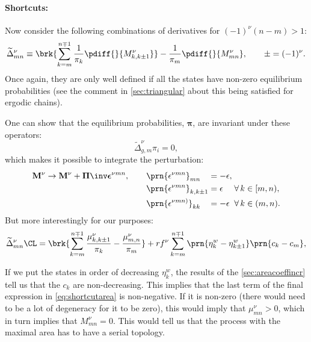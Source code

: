 \documentclass[12pt]{article}
\newcommand{\eqm}{\pi}
\newcommand{\eq}{\boldsymbol{\eqm}}
\newcommand{\Eqm}{\Pi}
\newcommand{\Eq}{\boldsymbol{\Eqm}}
\newcommand{\etwm}{\eta^w}
\newcommand{\MMdm}{M}
\newcommand{\MMd}{\mathbf{\MMdm}}
\newcommand{\kktm}{\mu}
\begin{document}
\paragraph{Shortcuts:}\label{sec:shortcuts}

Now consider the following combinations of derivatives for $(-1)^\nu (n - m) > 1$:
%
\begin{equation}\label{eq:shortcutderiv}
  \widetilde{\Delta}^\nu_{mn} \equiv
    \brk{ \sum_{k=m}^{n \mp 1} \frac{1}{\eqm_{k}} \pdiff{}{\MMdm^\nu_{k,k \pm 1}} }
    - \frac{1}{\eqm_m} \pdiff{}{\MMdm^\nu_{mn}},
  \qquad \pm = (-1)^\nu.
\end{equation}
%
Once again, they are only well defined if all the states have non-zero equilibrium probabilities (see the comment in \cref{sec:triangular} about this being satisfied for ergodic chains).

One can show that the equilibrium probabilities, $\eq$, are invariant under these operators:
%
\begin{equation}\label{eq:shortcutprob}
  \widetilde{\Delta}^\nu_{g,m} \eqm_i = 0,
\end{equation}
%
which makes it possible to integrate the perturbation:
%
\begin{equation}\label{eq:shortcutfinite}
  \MMd^\nu \to \MMd^\nu + \Eq\inv \boldsymbol{\epsilon}^{\nu mn},
  \qquad
  \begin{alignedat}[t]{3}
    &\prn{{\epsilon}^{\nu mn}}_{mn}
      &&= -\epsilon,\\
    &\prn{{\epsilon}^{\nu mn}}_{k,k\pm1}
      &&= \epsilon
      &\;&\forall\, k \in [m,n),\\
    &\prn{{\epsilon}^{\nu mn)}}_{kk}
      &&= -\epsilon
      &&\forall\, k \in (m,n).
  \end{alignedat}
\end{equation}
%
But more interestingly for our purposes:
%
\begin{equation}\label{eq:shortcutarea}
    \widetilde{\Delta}^\nu_{mn}\CL =
      \brk{ \sum_{k=m}^{n\mp1} \frac{\kktm^\nu_{k,k\pm1}}{\eqm_k}
      - \frac{\kktm^\nu_{m,n}}{\eqm_m}}
      + rf^\nu \sum_{k=m}^{n\mp1} \prn{\etwm_{k} - \etwm_{k\pm1}} \prn{c_k - c_m},
\end{equation}
%

If we put the states in order of decreasing $\etwm_k$, the results of the \cref{sec:areacoeffincr} tell us that the $c_k$ are non-decreasing.
This implies that the last term of the final expression in \eqref{eq:shortcutarea} is non-negative.
If it is non-zero (there would need to be a lot of degeneracy for it to be zero), this would imply that $\kktm^\nu_{mn} > 0$, which in turn implies that $\MMdm^\nu_{mn}=0$.
This would tell us that the process with the maximal area has to have a serial topology.
\end{document}
